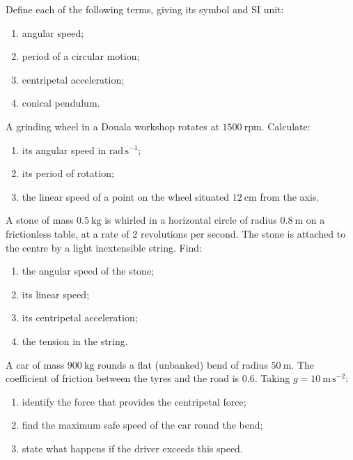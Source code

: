 \documentclass[11pt]{article}
\newcounter{popsec}
\newcounter{popsub}
\newcommand{\courssub}[1]{%
  \stepcounter{popsub}%
  \par\vspace{9pt}\noindent{\popxbold\fontsize{11.5}{13}\selectfont\color{popink}{\color{poporange}\thepopsec.\thepopsub}\hspace{6pt}#1}\par\nopagebreak\vspace{4pt}
}
\begin{document}
\begin{exercice}[Definitions]
Define each of the following terms, giving its symbol and SI unit:
\begin{enumerate}
\item angular speed;
\item period of a circular motion;
\item centripetal acceleration;
\item conical pendulum.
\end{enumerate}
\end{exercice}

\begin{exercice}
A grinding wheel in a Douala workshop rotates at $1500\ \mathrm{rpm}$. Calculate:
\begin{enumerate}
\item its angular speed in $\mathrm{rad\,s^{-1}}$;
\item its period of rotation;
\item the linear speed of a point on the wheel situated $12\ \mathrm{cm}$ from the axis.
\end{enumerate}
\end{exercice}

\courssub{I practise}

\begin{exercice}
A stone of mass $0.5\ \mathrm{kg}$ is whirled in a horizontal circle of radius $0.8\ \mathrm{m}$ on a frictionless table, at a rate of $2$ revolutions per second. The stone is attached to the centre by a light inextensible string. Find:
\begin{enumerate}
\item the angular speed of the stone;
\item its linear speed;
\item its centripetal acceleration;
\item the tension in the string.
\end{enumerate}
\end{exercice}

\begin{exercice}
A car of mass $900\ \mathrm{kg}$ rounds a flat (unbanked) bend of radius $50\ \mathrm{m}$. The coefficient of friction between the tyres and the road is $0.6$. Taking $g = 10\ \mathrm{m\,s^{-2}}$:
\begin{enumerate}
\item identify the force that provides the centripetal force;
\item find the maximum safe speed of the car round the bend;
\item state what happens if the driver exceeds this speed.
\end{enumerate}
\end{exercice}
\end{document}
